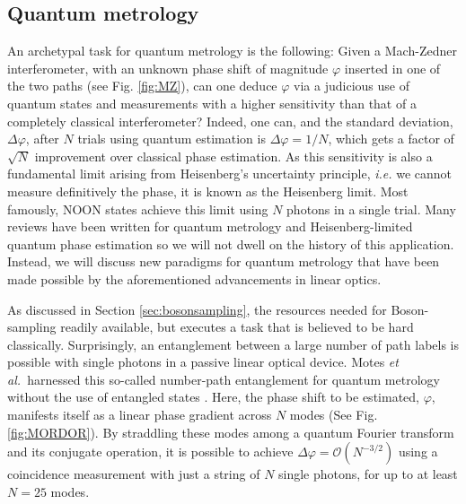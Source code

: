 \documentclass[times,final]{elsarticle}
\newcommand{\peter}[1]{{\color{blue}{#1}}}
\begin{document}
\subsection{Quantum metrology}\label{subsec:metrology}
An archetypal task for quantum metrology is the following: Given a Mach-Zedner interferometer, with an unknown phase shift of magnitude $\varphi$ inserted in one of the two paths (see Fig. \ref{fig:MZ}), can one deduce $\varphi$ via a judicious use of quantum states and measurements with a higher sensitivity than that of a completely classical interferometer? Indeed, one can, and the standard deviation, $\Delta\varphi$, after $N$ trials using quantum estimation is $\Delta\varphi=1/N$, which gets a factor of $\sqrt{N}$ improvement over classical phase estimation. As this sensitivity is also a fundamental limit arising from Heisenberg's uncertainty principle, {\it i.e.} we cannot measure definitively the phase, it is known as the Heisenberg limit. Most famously, NOON states achieve this limit using $N$ photons in a single trial. Many reviews have been written for quantum metrology and Heisenberg-limited quantum phase estimation \cite{bib:Giovannetti04,bib:Dowling08,bib:Giovannetti11} so we will not dwell on the history of this application. Instead, we will discuss new paradigms for quantum metrology that have been made possible by the aforementioned advancements in linear optics.
 


 
 As discussed in Section \ref{sec:bosonsampling}, the resources needed for Boson-sampling \peter{are} readily available, but executes a task that is believed to be hard classically. Surprisingly, an entanglement between a large number of path labels is possible with single photons in a passive linear optical device. Motes {\it et al.~}harnessed this so-called number-path entanglement for quantum metrology without the use of entangled states \cite{bib:Motes15_LOQM}. Here, the phase shift to be estimated, $\varphi$, manifests itself as a linear phase gradient across $N$ modes (See Fig. \ref{fig:MORDOR}). By straddling these modes among a quantum Fourier transform and its conjugate operation, it is possible to achieve $\Delta \varphi=\mathcal{O}(N^{-3/2})$ using a coincidence measurement with just a string of $N$ single photons, for up to at least $N=25$ modes. 
 
\end{document}
